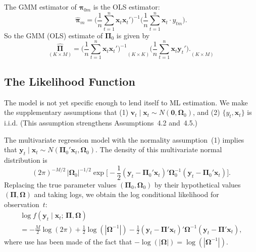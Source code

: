 The GMM estimator of $\boldsymbol{\pi}_{0m}$ is the OLS estimator:
\begin{equation}
  \hat{\boldsymbol{\pi}}_m
  = \biggl(\frac{1}{n}\sum_{t=1}^{n} \mathbf{x}_t\mathbf{x}_t'\biggr)^{-1}
    \biggl(\frac{1}{n}\sum_{t=1}^{n} \mathbf{x}_t \cdot y_{tm}\biggr).
  \label{eq:8.4.4} \tag{8.4.4}
\end{equation}
So the GMM (OLS) estimate of $\boldsymbol{\Pi}_0$ is given by
\begin{equation}
  \underset{(K \times M)}{\hat{\boldsymbol{\Pi}}}
  = \biggl(\frac{1}{n}\sum_{t=1}^{n} \mathbf{x}_t\mathbf{x}_t'\biggr)^{-1}
    \underset{(K \times K)}{\phantom{x}}
    \biggl(\frac{1}{n}\sum_{t=1}^{n} \mathbf{x}_t\mathbf{y}_t'\biggr).
    \underset{(K \times M)}{\phantom{x}}
  \label{eq:8.4.5} \tag{8.4.5}
\end{equation}

\subsection*{The Likelihood Function}

The model is not yet specific enough to lend itself to ML estimation. We make the
supplementary assumptions that (1) $\mathbf{v}_t \mid \mathbf{x}_t \sim N(\mathbf{0}, \boldsymbol{\Omega}_0)$, and
(2) $\{y_t, \mathbf{x}_t\}$ is i.i.d.
(This assumption strengthens Assumptions~4.2 and~4.5.)

The multivariate regression model with the normality assumption~(1) implies
that $\mathbf{y}_t \mid \mathbf{x}_t \sim N(\boldsymbol{\Pi}_0'\mathbf{x}_t, \boldsymbol{\Omega}_0)$.
The density of this multivariate normal distribution is
\begin{equation}
  (2\pi)^{-M/2}\,|\boldsymbol{\Omega}_0|^{-1/2}
  \exp\biggl[-\frac{1}{2}(\mathbf{y}_t - \boldsymbol{\Pi}_0'\mathbf{x}_t)'
    \boldsymbol{\Omega}_0^{-1}
    (\mathbf{y}_t - \boldsymbol{\Pi}_0'\mathbf{x}_t)\biggr].
  \label{eq:8.4.6} \tag{8.4.6}
\end{equation}
Replacing the true parameter values $(\boldsymbol{\Pi}_0, \boldsymbol{\Omega}_0)$ by their hypothetical values
$(\boldsymbol{\Pi}, \boldsymbol{\Omega})$ and taking logs, we obtain the log conditional likelihood for observation~$t$:
\begin{multline}
  \log f(\mathbf{y}_t \mid \mathbf{x}_t;\, \boldsymbol{\Pi}, \boldsymbol{\Omega}) \\
  = -\frac{M}{2}\log(2\pi)
    + \frac{1}{2}\log(|\boldsymbol{\Omega}^{-1}|)
    - \frac{1}{2}(\mathbf{y}_t - \boldsymbol{\Pi}'\mathbf{x}_t)'
      \boldsymbol{\Omega}^{-1}
      (\mathbf{y}_t - \boldsymbol{\Pi}'\mathbf{x}_t),
  \label{eq:8.4.7} \tag{8.4.7}
\end{multline}
where use has been made of the fact that $-\log(|\boldsymbol{\Omega}|) = \log(|\boldsymbol{\Omega}^{-1}|)$.

